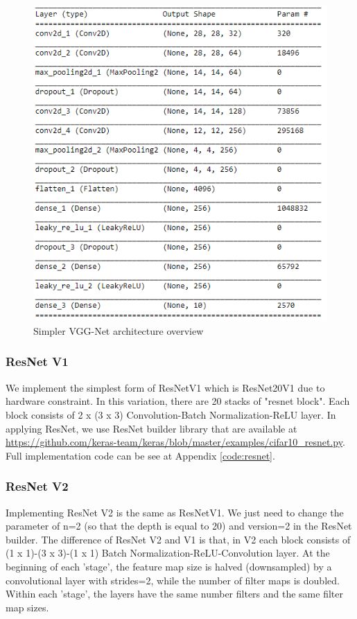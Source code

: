 \begin{figure}[h]
	\includegraphics[scale=0.5]{figures/vgg_arch}
	\centering
	\caption{Simpler VGG-Net architecture overview}
	\label{fig:vgg_arch}
\end{figure}

\subsubsection{ResNet V1}
We implement the simplest form of ResNetV1 which is ResNet20V1 due to hardware constraint. In this variation, there are 20 stacks of "resnet block". Each block consists of 2 x (3 x 3) Convolution-Batch Normalization-ReLU layer. 
In applying ResNet, we use ResNet builder library that are available at \href{https://github.com/keras-team/keras/blob/master/examples/cifar10\_resnet.py}{https://github.com/keras-team/keras/blob/master/examples/cifar10\_resnet.py}. Full implementation code can be see at Appendix \ref{code:resnet}.

\subsubsection{ResNet V2}
Implementing ResNet V2 is the same as ResNetV1. We just need to change the parameter of n=2 (so that the depth is equal to 20) and version=2 in the ResNet builder. The difference of ResNet V2 and V1 is that, in V2 each block consists of  (1 x 1)-(3 x 3)-(1 x 1) Batch Normalization-ReLU-Convolution layer. At the beginning of each 'stage', the feature map size is halved (downsampled) by a convolutional layer with strides=2, while the number of filter maps is doubled. Within each 'stage', the layers have the same number filters and the
same filter map sizes.


